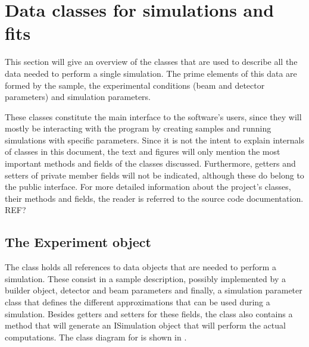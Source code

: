 

\section{Data classes for simulations and fits}

This section will give an overview of the classes that are used to describe all the data needed to perform a single simulation. The prime elements of this data are formed by the sample, the experimental conditions (beam and detector parameters) and simulation parameters.

These classes constitute the main interface to the software's users, since they will mostly be interacting with the program by creating samples and running simulations with specific parameters. Since it is not the intent to explain internals of classes in this document, the text and figures will only mention the most important methods and fields of the classes discussed. Furthermore, getters and setters of private member fields will not be indicated, although these do belong to the public interface. For more detailed information about the project's classes, their methods and fields, the reader is referred to the source code documentation. REF?



\subsection{The Experiment object}
The  class holds all references to data objects that are needed to perform a simulation. These consist in a sample description, possibly implemented by a builder object, detector and beam parameters and finally, a simulation parameter class that defines the different approximations that can be used during a simulation. Besides getters and setters for these fields, the class also contains a  method that will generate an ISimulation object that will perform the actual computations. The class diagram for  is shown in .

